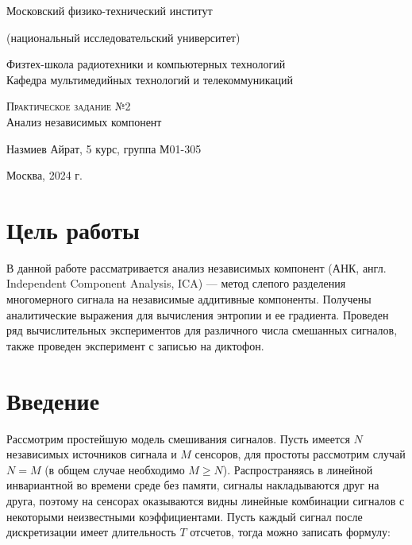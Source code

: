 \documentclass[a4paper,12pt]{article}
\begin{document}
	
	\begin{titlepage}
		\begin{center}
			
			\vspace{0.5cm}
			\large
			Московский физико-технический институт 
			
			(национальный исследовательский университет)
			\vspace{0.25cm}
			
			Физтех-школа радиотехники и компьютерных технологий \\
			
			Кафедра мультимедийных технологий и телекоммуникаций
			\vfill
			
			\textsc{Практическое задание №2}\\[5mm]
			
			{\LARGE Анализ независимых компонент}
			\bigskip
			
			Назмиев Айрат, 5 курс, группа М01-305
		\end{center}
		\vfill
		
		\newlength{\ML}
		
		\vfill
		\vfill
		
		\begin{center}
			Москва, 2024 г.
		\end{center}
		
	\end{titlepage}
	
	\section*{Цель работы}
	В данной работе рассматривается анализ независимых компонент (АНК, англ. Independent Component Analysis, ICA) --- метод слепого разделения многомерного сигнала на независимые аддитивные компоненты. Получены аналитические выражения для вычисления энтропии и ее градиента. Проведен ряд вычислительных экспериментов для различного числа смешанных сигналов, также проведен эксперимент с записью на диктофон.
	
	\section*{Введение}
	
	Рассмотрим простейшую модель смешивания сигналов. Пусть имеется $N$ независимых источников сигнала и $M$ сенсоров, для простоты рассмотрим случай $N = M$ (в общем случае необходимо $M \ge N$). Распространяясь в линейной инвариантной во времени среде без памяти, сигналы накладываются друг на друга, поэтому на сенсорах оказываются видны линейные комбинации сигналов с некоторыми неизвестными коэффициентами. Пусть каждый сигнал после дискретизации имеет длительность $T$ отсчетов, тогда можно записать формулу:
	
\end{document}
